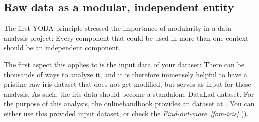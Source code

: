 \subsection{Raw data as a modular, independent entity}
\label{\detokenize{basics/101-130-yodaproject:raw-data-as-a-modular-independent-entity}}
\sphinxAtStartPar
The first YODA principle stressed the importance of modularity in a data analysis
project: Every component that could be used in more than one context should be
an independent component.

\sphinxAtStartPar
The first aspect this applies to is the input data of your dataset: There can
be thousands of ways to analyze it, and it is therefore immensely helpful to
have a pristine raw iris dataset that does not get modified, but serves as
input for these analysis.
As such, the iris data should become a standalone DataLad dataset.
For the purpose of this analysis, the online\sphinxhyphen{}handbook provides an 
dataset at .
You can either use this provided input dataset, or check the \textit{Find-out-more}~{\findoutmoreiconinline}\textit{\ref{fom-iris}} {\hyperref[\detokenize{basics/101-130-yodaproject:fom-iris}]{}} ().

